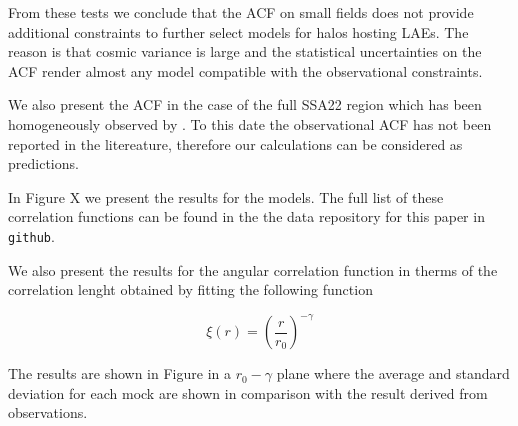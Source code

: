 \documentclass[usenatbib]{mn2e}
\begin{document}
From these tests we conclude that the ACF on small fields does not
provide additional constraints to further select models for halos
hosting LAEs. The reason is that cosmic variance is large and the
statistical uncertainties on the ACF render almost any model
compatible with the observational constraints. 

We also present the ACF in the case of the full SSA22
region which has been homogeneously observed by \citep{Yamada2012}. To
this date the observational ACF has not been reported in the
litereature, therefore our calculations can be considered as
predictions. 

In Figure X we present the results for the models. The full list of
these correlation functions can be found in the the data repository
for this paper in \verb"github". 

We also present the results for the angular correlation function in
therms of the correlation lenght obtained by fitting the following
function

\begin{equation}
\xi(r) = \left(\frac{r}{r_{0}}\right)^{-\gamma}
\end{equation}

The results are shown in Figure in a $r_{0}-\gamma$ plane where the
average and standard deviation for each mock are shown in comparison
with the result derived from observations. 



\end{document}
